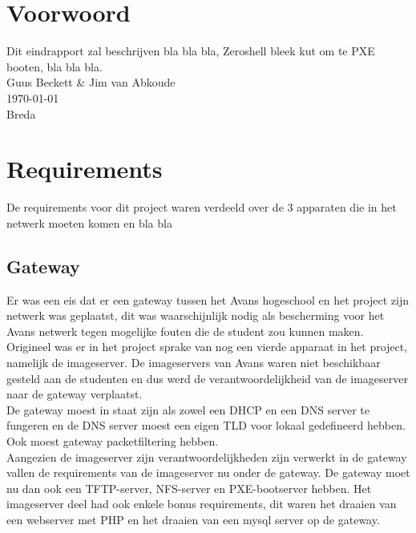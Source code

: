 \documentclass[12pt]{article}
\begin{document}
\clearpage
\section*{Voorwoord}
Dit eindrapport zal beschrijven bla bla bla, Zeroshell bleek kut om te PXE booten, bla bla bla.
\\
Guus Beckett \& Jim van Abkoude \\
\today \\
Breda
\newpage
\tableofcontents
\newpage
{}
\section{Requirements}
De requirements voor dit project waren verdeeld over de 3 apparaten die in het netwerk moeten komen en bla bla
\subsection{Gateway} %
\label{sub:gateway}
Er was een eis dat er een gateway tussen het Avans hogeschool en het project zijn netwerk was geplaatst, dit was waarschijnlijk nodig als bescherming voor het Avans netwerk tegen mogelijke fouten die de student zou kunnen maken. Origineel was er in het project sprake van nog een vierde apparaat in het project, namelijk de imageserver. De imageservers van Avans waren niet beschikbaar gesteld aan de studenten en dus werd de verantwoordelijkheid van de imageserver naar de gateway verplaatst.
\\De gateway moest in staat zijn als zowel een DHCP en een DNS server te fungeren en de DNS server moest een eigen TLD voor lokaal gedefineerd hebben. Ook moest gateway packetfiltering hebben.
\\Aangezien de imageserver zijn verantwoordelijkheden zijn verwerkt in de gateway vallen de requirements van de imageserver nu onder de gateway. De gateway moet nu dan ook een TFTP-server, NFS-server en PXE-bootserver hebben. Het imageserver deel had ook enkele bonus requirements, dit waren het draaien van een webserver met PHP en het draaien van een mysql server op de gateway.
\end{document}
